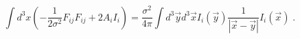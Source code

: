\begin{equation}
\int d^{3}x\left( -\frac{1}{2\sigma ^{2}}F_{ij}F_{ij}+2A_{i}I_{i}\right) =%
\frac{\sigma ^{2}}{4\pi }\int d^{3}\overrightarrow{y}d^{3}\overrightarrow{x}%
I_{i}\left( \overrightarrow{y}\right) \frac{1}{|\overrightarrow{x}-%
\overrightarrow{y}|}I_{i}\left( \overrightarrow{x}\right) \;.  \label{ea}
\end{equation}

